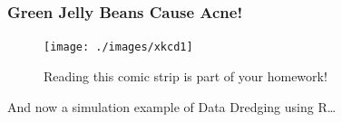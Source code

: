%
%
%
%
%
%
%
%
%
%
%
\begin{frame}
\frametitle{Green Jelly Beans Cause Acne!}
\framesubtitle{\href{http://xkcd.com/882/}{}}
\begin{figure}
\centering
	\texttt{[image: ./images/xkcd1]}
  \caption{Reading this comic strip is part of your homework!}
\end{figure}


\alert{And now a simulation example of Data Dredging using R\dots}
\end{frame}


